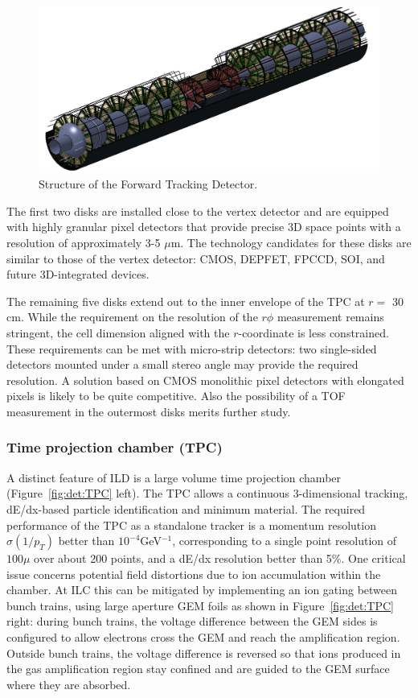 \begin{figure}[t!]
\centering
\includegraphics[width=0.75\hsize]{Detector/fig/FTD.png}
\caption{Structure of the Forward Tracking Detector.}
\label{fig:det:FTD}
\end{figure}

The first two disks are installed close to the vertex detector and are equipped with highly granular pixel detectors that provide precise 3D space points with a resolution of approximately 3-5 $\mu\mathrm{m}$. The technology candidates for these disks are similar to those of the vertex detector: CMOS, DEPFET, FPCCD, SOI, and future 3D-integrated devices. 

The remaining five disks extend out to the inner envelope of the TPC at $r=$ 30 cm. While the requirement on the resolution of the $r\phi$ measurement remains stringent, the cell dimension aligned with the $r$-coordinate is less constrained. These requirements can be met with micro-strip detectors: two single-sided detectors mounted under a small stereo angle may provide the required resolution. A solution based on CMOS monolithic pixel detectors with elongated pixels is likely to be quite competitive. Also the possibility of a TOF measurement in the outermost disks merits further study.

\subsubsection*{Time projection chamber (TPC)}

A distinct feature of ILD is a large volume time projection chamber (Figure~\ref{fig:det:TPC} left). The TPC allows a continuous 3-dimensional tracking, dE/dx-based particle identification and minimum material. The required performance of the TPC as a standalone tracker is a momentum resolution $\sigma(1/p_T)$ better than $10^{-4}$GeV$^{-1}$, corresponding to a single point resolution of $100\mu$ over about 200 points, and a dE/dx resolution better than 5\%. One critical issue concerns potential field distortions due to ion accumulation within the chamber. At ILC this can be mitigated by implementing an ion gating between bunch trains, using large aperture GEM foils as shown in Figure~\ref{fig:det:TPC} right: during bunch trains, the voltage difference between the GEM sides is configured to allow electrons cross the GEM and reach the amplification region. Outside bunch trains, the voltage difference is reversed so that ions produced in the gas amplification region stay confined and are guided to the GEM surface where they are absorbed. 


